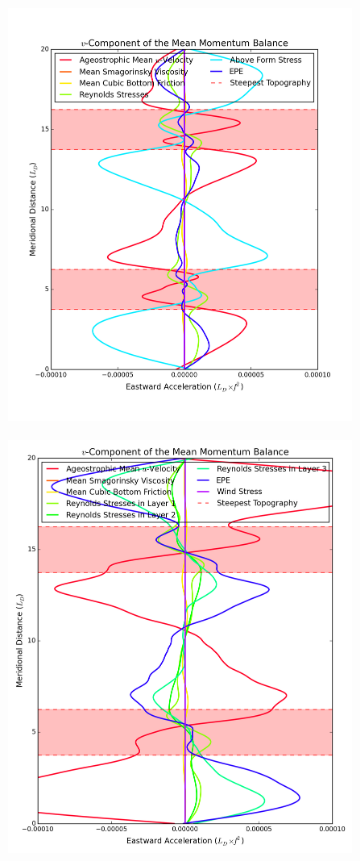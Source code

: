 \documentclass[12pt,a4paper]{report}
\begin{document}
\begin{figure}
\begin{subfigure}{0.48\linewidth}
 		\label{fig:vmomlayer2}
 	\end{subfigure}
 	\begin{subfigure}{0.48\linewidth}
 		\centering
 		\caption{}
 		\includegraphics[width=\linewidth ]{vmom_1}
 		\label{fig:vmomlayer1}
 	\end{subfigure}
 	\quad
 	\begin{subfigure}{0.48\linewidth}
 		\centering
 		\caption{}
 		\includegraphics[width=0.91\linewidth ]{vmom_4}

\end{subfigure}
\end{figure}
\end{document}
